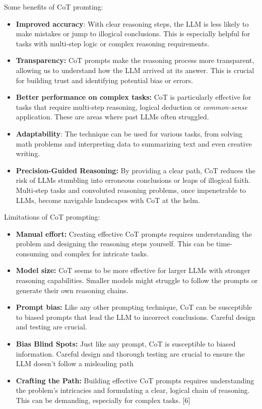 \documentclass{article}
\begin{document}
Some benefits of CoT promting:
\begin{itemize}
    \item \textbf{Improved accuracy}: With clear reasoning steps, the LLM is less likely to make mistakes or jump to illogical conclusions. This is especially helpful for tasks with multi-step logic or complex reasoning requirements.
    \item \textbf{Transparency:} CoT prompts make the reasoning process more transparent, allowing us to understand how the LLM arrived at its answer. This is crucial for building trust and identifying potential bias or errors.
    \item \textbf{Better performance on complex tasks:} CoT is particularly effective for tasks that require multi-step reasoning, logical deduction or \textit{common-sense} application. These are areas where past LLMs often struggled.
    \item \textbf{Adaptability}: The technique can be used for various tasks, from solving math problems and interpreting data to summarizing text and even creative writing.
    \item \textbf{Precision-Guided Reasoning:} By providing a clear path, CoT reduces the risk of LLMs stumbling into erroneous conclusions or leaps of illogical faith. Multi-step tasks and convoluted reasoning problems, once impenetrable to LLMs, become navigable landscapes with CoT at the helm.

\end{itemize}

Limitations of CoT prompting:
\begin{itemize}
    \item \textbf{Manual effort:} Creating effective CoT prompts requires understanding the problem and designing the reasoning steps yourself. This can be time-consuming and complex for intricate tasks.
    \item \textbf{Model size:} CoT seems to be more effective for larger LLMs with stronger reasoning capabilities. Smaller models might struggle to follow the prompts or generate their own reasoning chains.
    \item \textbf{Prompt bias:} Like any other prompting technique, CoT can be susceptible to biased prompts that lead the LLM to incorrect conclusions. Careful design and testing are crucial.
    \item \textbf{Bias Blind Spots:} Just like any prompt, CoT is susceptible to biased information. Careful design and thorough testing are crucial to ensure the LLM doesn’t follow a misleading path
    \item \textbf{Crafting the Path:} Building effective CoT prompts requires understanding the problem’s intricacies and formulating a clear, logical chain of reasoning. This can be demanding, especially for complex tasks. [6]

\end{itemize}
\end{document}

